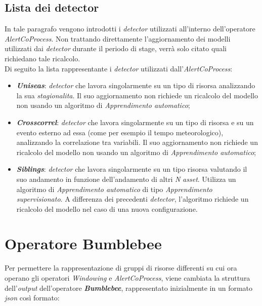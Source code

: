 \subsection{Lista dei detector}\label{sec:detector-alertcoprocess}
In tale paragrafo vengono introdotti i \textit{detector} utilizzati all'interno dell'operatore \textit{AlertCoProcess}. Non trattando direttamente l'aggiornamento dei modelli utilizzati dai \textit{detector} durante il periodo di stage, verrà solo citato quali richiedano tale ricalcolo.\\
Di seguito la lista rappresentante i \textit{detector} utilizzati dall'\textit{AlertCoProcess}:
\begin{itemize}
	\item{\textbf{\textit{Uniseas}}: \textit{detector} che lavora singolarmente su un tipo di risorsa analizzando la sua \textit{\gls{stagionalita}}. Il suo aggiornamento non richiede un ricalcolo del modello non usando un algoritmo di \textit{\gls{Apprendimento automatico}};}
	\item{\textbf{\textit{Crosscorrel}}: \textit{detector} che lavora singolarmente su un tipo di risorsa e su un evento esterno ad essa (come per esempio il tempo meteorologico), analizzando la correlazione tra variabili. Il suo aggiornamento non richiede un ricalcolo del modello non usando un algoritmo di \textit{\gls{Apprendimento automatico}};}
	\item{\textbf{\textit{Siblings}}: \textit{detector} che lavora singolarmente su un tipo risorsa valutando il suo andamento in funzione dell'andamento di altri \textit{N} \textit{asset}. Utilizza un algoritmo di \textit{\gls{Apprendimento automatico}} di tipo \textit{\gls{Apprendimento supervisionato}}. A differenza dei precedenti \textit{detector}, l'algoritmo richiede un ricalcolo del modello nel caso di una nuova configurazione.}
\end{itemize}


\section{Operatore Bumblebee}\label{sec:bbout}
Per permettere la rappresentazione di gruppi di risorse differenti su cui ora operano gli operatori \textit{Windowing} e \textit{AlertCoProcess}, viene cambiata la struttura dell'\textit{output} dell'operatore \textbf{\textit{Bumblebee}}, rappresentato inizialmente in un formato \textit{\gls{json}} così formato:

